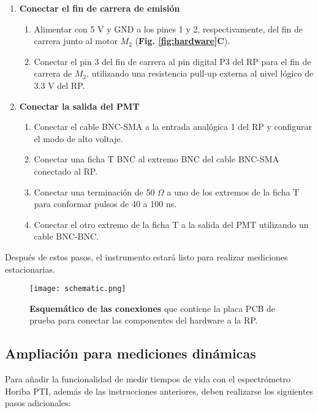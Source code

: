\begin{enumerate}
\begin{enumerate}
    \end{enumerate}
    \item \textbf{Conectar el fin de carrera de emisión}
    \begin{enumerate}
        \item Alimentar con 5 V y GND a los pines 1 y 2, respectivamente, del fin de carrera junto al motor $M_2$ (\textbf{Fig. \ref{fig:hardware}C}).
        \item Conectar el pin 3 del fin de carrera al pin digital P3 del RP para el fin de carrera de $M_2$, utilizando una resistencia pull-up externa al nivel lógico de 3.3 V del RP.
    \end{enumerate}
    \item \textbf{Conectar la salida del PMT}
    \begin{enumerate}
        \item Conectar el cable BNC-SMA a la entrada analógica 1 del RP y configurar el modo de alto voltaje.
        \item Conectar una ficha T BNC al extremo BNC del cable BNC-SMA conectado al RP.
        \item Conectar una terminación de 50 $\Omega$ a uno de los extremos de la ficha T para conformar pulsos de 40 a 100 ns.
        \item Conectar el otro extremo de la ficha T a la salida del PMT utilizando un cable BNC-BNC.
    \end{enumerate}
\end{enumerate}

\noindent Después de estos pasos, el instrumento estará listo para realizar mediciones estacionarias.

\begin{SCfigure}[][h]
         \centering
         \texttt{[image: schematic.png]}
         \caption{\textbf{Esquemático de las conexiones} que contiene la placa PCB de prueba para conectar las componentes del hardware a la RP.
         }
         \label{fig:schematic}
    \end{SCfigure}


\subsection{Ampliación para mediciones dinámicas}

Para añadir la funcionalidad de medir tiempos de vida con el espectrómetro Horiba PTI, además de las instrucciones anteriores, deben realizarse los siguientes pasos adicionales:

